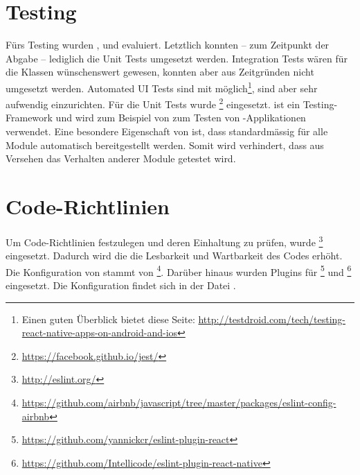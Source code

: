 \section{Testing}
\label{pd-entwicklungsumgebung-testing}
Fürs Testing wurden ,  und  evaluiert.
Letztlich konnten -- zum Zeitpunkt der Abgabe -- lediglich die Unit Tests umgesetzt werden.
Integration Tests wären für die  Klassen wünschenswert gewesen, konnten aber aus Zeitgründen nicht umgesetzt werden.
Automated UI Tests sind mit  möglich\footnote{Einen guten Überblick bietet diese Seite: \url{http://testdroid.com/tech/testing-react-native-apps-on-android-and-ios}}, sind aber sehr aufwendig einzurichten.
Für die Unit Tests wurde \footnote{\url{https://facebook.github.io/jest/}} eingesetzt. 
 ist ein  Testing-\gls{Framework} und wird zum Beispiel von  zum Testen von -Applikationen verwendet.\newline
Eine besondere Eigenschaft von  ist, dass standardmässig für alle Module automatisch  bereitgestellt werden.
Somit wird verhindert, dass aus Versehen das Verhalten anderer Module getestet wird.

\section{Code-Richtlinien}
\label{pd-entwicklungsumgebung-cr}
Um Code-Richtlinien festzulegen und deren Einhaltung zu prüfen, wurde \footnote{\url{http://eslint.org/}} eingesetzt.
Dadurch wird die die Lesbarkeit und Wartbarkeit des Codes erhöht.
Die Konfiguration von  stammt von \footnote{\url{https://github.com/airbnb/javascript/tree/master/packages/eslint-config-airbnb}}.
Darüber hinaus wurden Plugins für \footnote{\url{https://github.com/yannickcr/eslint-plugin-react}} und \footnote{\url{https://github.com/Intellicode/eslint-plugin-react-native}} eingesetzt.\newline
Die Konfiguration findet sich in der Datei .